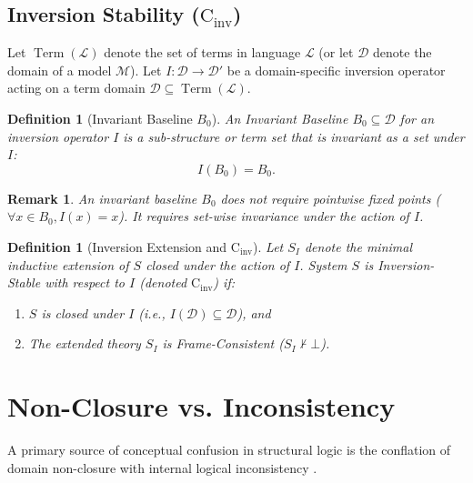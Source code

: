 \documentclass[11pt,a4paper]{article}
\newtheorem{definition}[theorem]{Definition}
\newtheorem{remark}[theorem]{Remark}
\begin{document}
\subsection{Inversion Stability (\texorpdfstring{$\mathrm{C}_{\mathrm{inv}}$}{C\_inv})}

Let $\operatorname{Term}(\mathcal{L})$ denote the set of terms in language 
$\mathcal{L}$ (or let $\mathcal{D}$ denote the domain of a model $\mathcal{M}$). 
Let $I: \mathcal{D} \to \mathcal{D}'$ be a domain-specific inversion operator 
acting on a term domain $\mathcal{D} \subseteq \operatorname{Term}(\mathcal{L})$.

\begin{definition}[Invariant Baseline $B_0$]
An \emph{Invariant Baseline} $B_0 \subseteq \mathcal{D}$ for an inversion 
operator $I$ is a sub-structure or term set that is invariant as a set 
under $I$:
\[
I(B_0) = B_0.
\]
\end{definition}

\begin{remark}
An invariant baseline $B_0$ does not require pointwise fixed points 
($\forall x \in B_0, I(x) = x$). It requires set-wise invariance under 
the action of $I$.
\end{remark}

\begin{definition}[Inversion Extension and $\mathrm{C}_{\mathrm{inv}}$]
Let $S_I$ denote the minimal inductive extension of $S$ closed under the 
action of $I$. System $S$ is \emph{Inversion-Stable} with respect to $I$ 
(denoted $\mathrm{C}_{\mathrm{inv}}$) if:
\begin{enumerate}[label=(\roman*)]
    \item $S$ is closed under $I$ (i.e., $I(\mathcal{D}) \subseteq \mathcal{D}$), and
    \item The extended theory $S_I$ is Frame-Consistent ($S_I \nvdash \bot$).
\end{enumerate}
\end{definition}

\section{Non-Closure vs. Inconsistency}

A primary source of conceptual confusion in structural logic is the 
conflation of domain non-closure with internal logical inconsistency 
\cite{russell1903, wittgenstein1922tractatus}.
\end{document}
